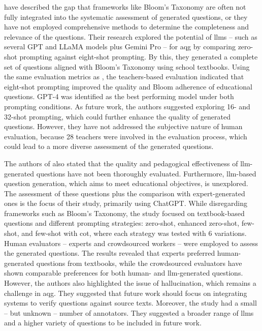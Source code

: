 \cite{maity_can_2025} have described the gap that frameworks like Bloom's Taxonomy are often not fully integrated into the systematic assessment of generated questions, or they have not employed comprehensive methods to determine the completeness and relevance of the questions. Their research explored the potential of \ac{llms} -- such as several GPT and LLaMA models plus Gemini Pro -- for \ac{aqg} by comparing zero-shot prompting against eight-shot prompting. By this, they generated a complete set of questions aligned with Bloom's Taxonomy using school textbooks. Using the same evaluation metrics as \cite{elkins_how_2023}, the teachers-based evaluation indicated that eight-shot prompting improved the quality and Bloom adherence of educational questions. GPT-4 was identified as the best performing model under both prompting conditions. As future work, the authors suggested exploring 16- and 32-shot prompting, which could further enhance the quality of generated questions. However, they have not addressed the subjective nature of human evaluation, because 28 teachers were involved in the evaluation process, which could lead to a more diverse assessment of the generated questions.

The authors of \cite{al_faraby_analysis_2024} also stated that the quality and pedagogical effectiveness of \ac{llm}-generated questions have not been thoroughly evaluated. Furthermore, \ac{llm}-based question generation, which aims to meet educational objectives, is unexplored. The assessment of these questions plus the comparison with expert-generated ones is the focus of their study, primarily using ChatGPT. While disregarding frameworks such as Bloom's Taxonomy, the study focused on textbook-based questions and different prompting strategies: zero-shot, enhanced zero-shot, few-shot, and few-shot with \ac{cot}, where each strategy was tested with 6 variations. Human evaluators -- experts and crowdsourced workers -- were employed to assess the generated questions. The results revealed that experts preferred human-generated questions from textbooks, while the crowdsourced evaluators have shown comparable preferences for both human- and \ac{llm}-generated questions. However, the authors also highlighted the issue of hallucination, which remains a challenge in \ac{aqg}. They suggested that future work should focus on integrating systems to verify questions against source texts. Moreover, the study had a small -- but unknown -- number of annotators. They suggested a broader range of \ac{llms} and a higher variety of questions to be included in future work.

